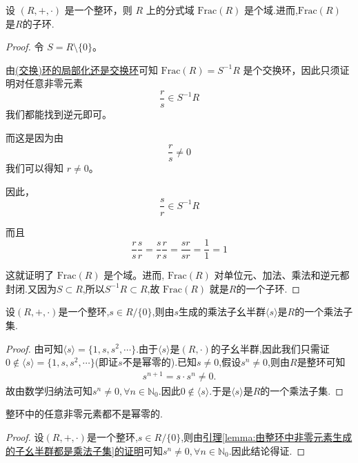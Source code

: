\documentclass[../../main.tex]{subfiles}
\begin{document}
\begin{proposition}[分式域是域]
设 $(R, +, \cdot)$ 是一个整环，则 $R$ 上的分式域 $\mathrm{Frac}(R)$ 是个域.进而,$\mathrm{Frac}(R)$ 是$R$的子环.
\end{proposition}
\begin{proof}
令 $S = R \setminus \{0\}$。

由\hyperref[proposition:(交换)环的局部化还是交换环]{(交换)环的局部化还是交换环}可知   $\mathrm{Frac}(R) = S^{-1}R$ 是个交换环，因此只须证明对任意非零元素
\[\frac{r}{s} \in S^{-1}R\]
我们都能找到逆元即可。

而这是因为由
\[\frac{r}{s} \neq 0\]
我们可以得知 $r \neq 0$。

因此，
\[\frac{s}{r} \in S^{-1}R\]

而且
\[\frac{r}{s}\frac{s}{r} = \frac{s}{r}\frac{r}{s} = \frac{sr}{sr} = \frac{1}{1} = 1\]

这就证明了 $\mathrm{Frac}(R)$ 是个域。进而, $\mathrm{Frac}(R)$ 对单位元、加法、乘法和逆元都封闭.又因为$S\subset R$,所以$S^{-1}R\subset R$,故 $\mathrm{Frac}(R)$ 就是$R$的一个子环.

\end{proof}

\begin{lemma}\label{lemma:由整环中非零元素生成的子幺半群都是乘法子集}
设$(R,+,\cdot)$是一个整环,$s\in R/\{0\}$,则由$s$生成的乘法子幺半群$\langle s\rangle$是$R$的一个乘法子集.
\end{lemma}
\begin{proof}
由可知$\langle s \rangle=\{1,s,s^2,\cdots\}$.由于$\langle s\rangle$是$(R,\cdot)$的子幺半群,因此我们只需证$0\notin \langle s \rangle=\{1,s,s^2,\cdots\}$(即证$s$不是幂零的).已知$s\ne 0$,假设$s^n\ne 0$,则由$R$是整环可知
\begin{align*}
s^{n+1}=s\cdot s^n\ne 0.
\end{align*}
故由数学归纳法可知$s^n\ne 0 ,\forall n\in \mathbb{N}_0$.因此$0\notin \langle s \rangle$.于是$\langle s\rangle$是$R$的一个乘法子集.

\end{proof}

\begin{corollary}
整环中的任意非零元素都不是幂零的.
\end{corollary}
\begin{proof}
设$(R,+,\cdot)$是一个整环,$s\in R/\{0\}$,则由\hyperref[lemma:由整环中非零元素生成的子幺半群都是乘法子集]{引理\ref{lemma:由整环中非零元素生成的子幺半群都是乘法子集}的证明}可知$s^n\ne 0 ,\forall n\in \mathbb{N}_0$.因此结论得证.

\end{proof}
\end{document}
